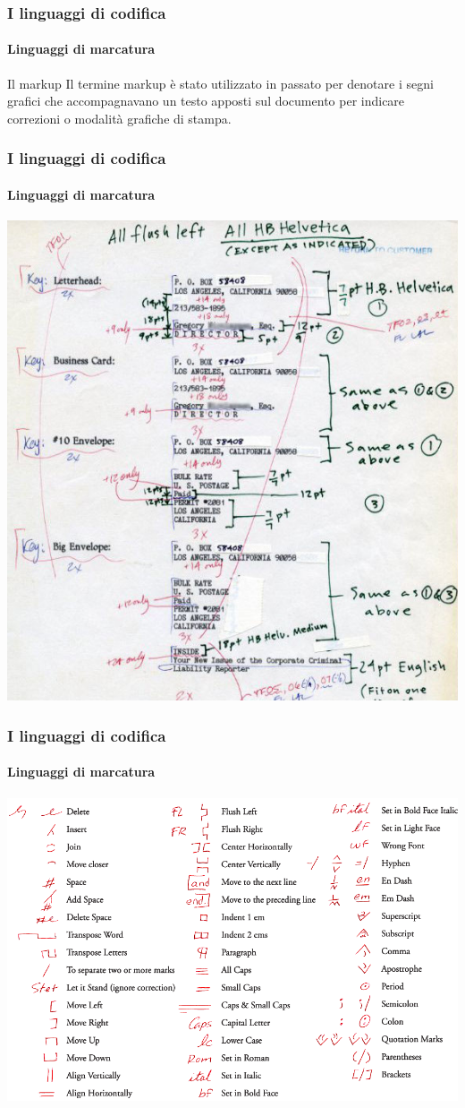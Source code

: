 \documentclass{beamer}
\begin{document}
\begin{frame}
	\frametitle{I linguaggi di codifica}
	\framesubtitle{Linguaggi di marcatura}
	\addtocounter{nframe}{1}

	\begin{block}{Il markup}
		Il termine markup è stato utilizzato in passato per denotare i segni grafici che accompagnavano un testo apposti sul documento per indicare correzioni o modalità grafiche di stampa.
	\end{block}

\end{frame}

\begin{frame}
	\frametitle{I linguaggi di codifica}
	\framesubtitle{Linguaggi di marcatura}
	\addtocounter{nframe}{1}

	\begin{center}
		\includegraphics[width=.6\textwidth]{imgs/xml-markup001.jpg}
	\end{center}

\end{frame}

\begin{frame}
	\frametitle{I linguaggi di codifica}
	\framesubtitle{Linguaggi di marcatura}
	\addtocounter{nframe}{1}

	\begin{center}
		\includegraphics[width=.9\textwidth]{imgs/xml-MarkupConvention.png}
	\end{center}

\end{frame}
\end{document}
